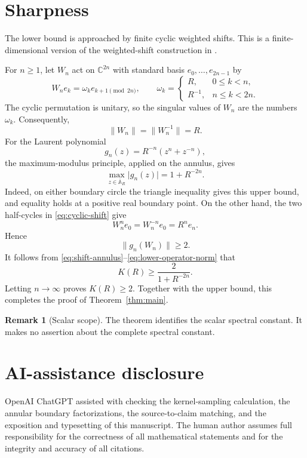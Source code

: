 \documentclass[preprints,article,submit,oneauthor]{Definitions/mdpi}
\newcounter{manuscriptresult}[section]
\theoremstyle{mdpi}
\theoremstyle{definition}
\newtheorem{remark}[manuscriptresult]{Remark}
\newcommand{\C}{\mathbb C}
\begin{document}
\section{Sharpness}
\label{sec:sharpness}

The lower bound is approached by finite cyclic weighted shifts.  This
is a finite-dimensional version of the weighted-shift construction in
\cite[Section~2]{Tsikalas2022}.

For $n\geq1$, let $W_n$ act on $\C^{2n}$ with standard basis
$e_0,\ldots,e_{2n-1}$ by
\begin{equation}
  W_ne_k=\omega_ke_{k+1\pmod{2n}},
  \qquad
  \omega_k=
  \begin{cases}
    R,&0\leq k<n,\\
    R^{-1},&n\leq k<2n.
  \end{cases}
  \label{eq:cyclic-shift}
\end{equation}
The cyclic permutation is unitary, so the singular values of $W_n$
are the numbers $\omega_k$.  Consequently,
\begin{equation}
  \lVert W_n\rVert=\lVert W_n^{-1}\rVert=R.
  \label{eq:shift-annulus}
\end{equation}
For the Laurent polynomial
\begin{equation}
  g_n(z)=R^{-n}(z^n+z^{-n}),
  \label{eq:lower-function}
\end{equation}
the maximum-modulus principle, applied on the annulus, gives
\begin{equation}
  \max_{z\in\overline{\mathbb A}_R}\lvert g_n(z)\rvert
  =1+R^{-2n}.
  \label{eq:lower-function-norm}
\end{equation}
Indeed, on either boundary circle the triangle inequality gives this
upper bound, and equality holds at a positive real boundary point.
On the other hand, the two half-cycles in \eqref{eq:cyclic-shift} give
\[
  W_n^ne_0=W_n^{-n}e_0=R^ne_n.
\]
Hence
\begin{equation}
  \lVert g_n(W_n)\rVert\geq2.
  \label{eq:lower-operator-norm}
\end{equation}
It follows from \eqref{eq:shift-annulus}--\eqref{eq:lower-operator-norm}
that
\[
  K(R)\geq\frac{2}{1+R^{-2n}}.
\]
Letting $n\to\infty$ proves $K(R)\geq2$.  Together with the upper
bound, this completes the proof of Theorem~\ref{thm:main}.

\begin{remark}[Scalar scope]
The theorem identifies the scalar spectral constant.  It makes no
assertion about the complete spectral constant.
\end{remark}

\section*{AI-assistance disclosure}

OpenAI ChatGPT assisted with checking the kernel-sampling calculation,
the annular boundary factorizations, the source-to-claim matching, and
the exposition and typesetting of this manuscript.  The human author
assumes full responsibility for the correctness of all mathematical
statements and for the integrity and accuracy of all citations.


\end{document}

